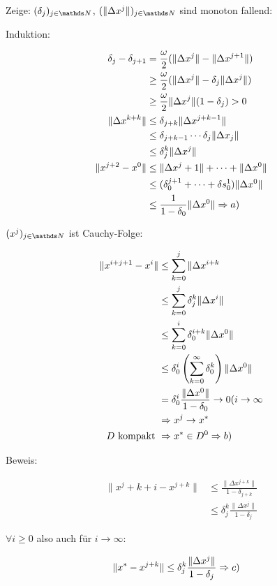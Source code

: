 Zeige: $(\delta_j)_{j \in \N}$, $(\|\Delta x^j\|)_{j \in \N}$ sind monoton fallend:

Induktion: 

\begin{align*}
\delta_j - \delta_{j+1} &= \frac \omega 2(\|\Delta x^j\| - \|\Delta x^{j+1}\|) \\
&\geq \frac \omega 2 (\|\Delta x^j\|-\delta_j \|\Delta x^j\|) \\
&\geq \frac \omega 2 \|\Delta x^j\| (1-\delta_j) > 0\\
\| \Delta x^{k+k} \| &\leq \delta_{j+k} \| \Delta x^{j+k-1} \| \\
& \leq \delta_{j+k-1} \cdots \delta_j \|\Delta x_j\| \\
& \leq \delta_j^k \|\Delta x^j\| \\
\| x^{j+2} - x^0 \| & \leq \|\Delta x^j+1\| + \cdots + \|\Delta x^0\| \\
&\leq ( \delta_0^{j+1} + \cdots + \delta s_0^1) \|\Delta x^0\| \\
&\leq \frac{1}{1-\delta_0} \|\Delta x^0\| \Rightarrow a)
\end{align*}


$(x^j)_{j \in \N}$ ist Cauchy-Folge:

\begin{align*}
\| x^{i+j+1} - x^i \| & \leq \sum_{k=0}^j \| \Delta x^{i+k} \\
&\leq \sum\limits_{k=0}^j \delta_j^k \| \Delta x^i\| \\
&\leq \sum\limits_{k=0}^i \delta_0^{i+k} \|\Delta x^0\| \\
&\leq \delta_0^i \left(\sum\limits_{k=0}^\infty \delta_0^k \right) \| \Delta x^0 \| \\
&= \delta_0^i \frac{\|\Delta x^0\|}{1-\delta_0} \to 0 (i \to \infty \\
& \Rightarrow x^j \to x^* \\
D \text{ kompakt } & \Rightarrow x^* \in D^0 \Rightarrow b)
\end{align*}

Beweis:

\begin{align*}
\|x^j+k+i-x^{j+k}\| & \leq \frac{\|\Delta x^{j+k}\|}{1-\delta_{j+k}} \\
&\leq \delta_j^k \frac{\|\Delta x^j\|}{1-\delta_j}
\end{align*}

$\forall i \geq 0$ also auch für $i \to \infty$:

\begin{align*}
\|x^* - x^{j+k} \| & \leq \delta_j^k \frac{\|\Delta x^j\|}{1-\delta_j} \Rightarrow c) 
\end{align*}

